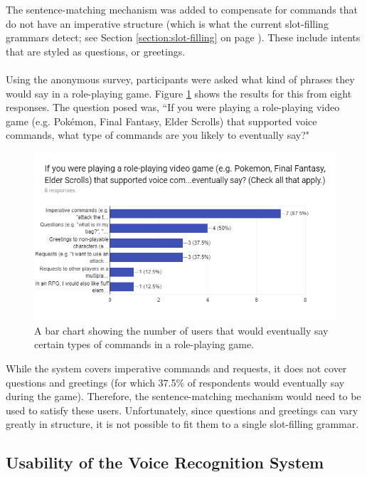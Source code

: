 \documentclass[11pt]{article}
\begin{document}
The sentence-matching mechanism was added to compensate for commands that do not have an imperative structure (which is what the current slot-filling grammars detect; see Section \ref{section:slot-filling} on page \pageref{section:slot-filling}). These include intents that are styled as questions, or greetings.
\\
\\
Using the anonymous survey, participants were asked what kind of phrases they would say in a role-playing game. Figure \ref{fig:survey-commands} shows the results for this from eight responses. The question posed was, ``If you were playing a role-playing video game (e.g. Pok\'emon, Final Fantasy, Elder Scrolls) that supported voice commands, what type of commands are you likely to eventually say?"

\begin{figure}[H]
\begin{center}
  \includegraphics[width=\linewidth]{survey-commands}
  \caption{A bar chart showing the number of users that would eventually say certain types of commands in a role-playing game.}
  \label{fig:survey-commands}
  \end{center}
\end{figure}

While the system covers imperative commands and requests, it does not cover questions and greetings (for which 37.5\% of respondents would eventually say during the game). Therefore, the sentence-matching mechanism would need to be used to satisfy these users. Unfortunately, since questions and greetings can vary greatly in structure, it is not possible to fit them to a single slot-filling grammar.

\subsection{Usability of the Voice Recognition System}
\end{document}
